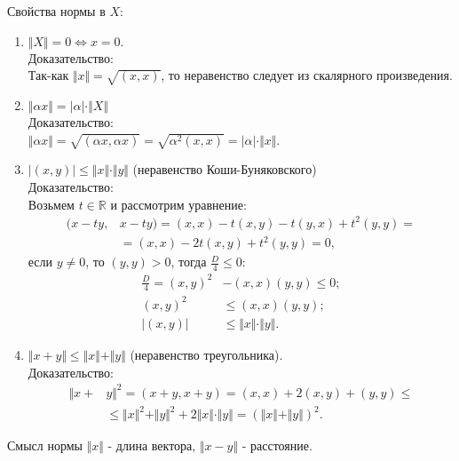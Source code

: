 \documentclass[a4paper, 12pt]{article}
\begin{document}
    Свойства нормы в $X$:
    \begin{enumerate}
        \item $\Vert X \Vert = 0 \Leftrightarrow x = 0.$\\
        Доказательство:\\
        Так-как $\Vert x \Vert = \sqrt{(x, x)}$, то неравенство следует из скалярного произведения.
        \item $\Vert \alpha x \Vert = |\alpha| \cdot \Vert X \Vert$ \\
        Доказательство:\\
        $\Vert \alpha x \Vert = \sqrt{(\alpha x, \alpha x)} = \sqrt{\alpha^2 (x, x)} = |\alpha| \cdot \Vert x \Vert$.
        \item $|(x, y)| \leqslant \Vert x \Vert \cdot \Vert y \Vert$ (неравенство Коши-Буняковского)\\
        Доказательство:\\
        Возьмем $t \in \mathbb{R}$ и рассмотрим уравнение:
        \begin{align*}
            (x-ty, &x - ty) = (x, x) - t(x,y) - t(y, x) + t^2(y, y) = \\
            &= (x, x) - 2t(x,y) + t^2(y,y) = 0,
        \end{align*}
        если $y \neq 0$, то $(y, y) > 0$, тогда $\frac{D}{4} \leqslant 0$:
        \begin{align*}
            \frac{D}{4} = (x, y)^2 &- (x, x)(y, y) \leqslant 0;\\
            (x, y)^2 &\leqslant (x, x)(y, y);\\
            |(x, y)| &\leqslant \Vert x \Vert \cdot \Vert y \Vert.
        \end{align*}

        \item $\Vert x + y \Vert \leqslant  \Vert x \Vert + \Vert y \Vert$ (неравенство треугольника).\\
        Доказательство:
        \begin{align*}
            \Vert x + &y \Vert^2 = (x + y, x + y) = (x, x) + 2(x, y) + (y, y) \leqslant \\
            &\leqslant \Vert x \Vert^2 + \Vert y \Vert^2 + 2\Vert x \Vert \cdot \Vert y \Vert = (\Vert x \Vert + \Vert y \Vert)^2.
        \end{align*}
    \end{enumerate}

    Смысл нормы $\Vert x \Vert$ - длина вектора, $\Vert x - y \Vert$ - расстояние.
\end{document}
